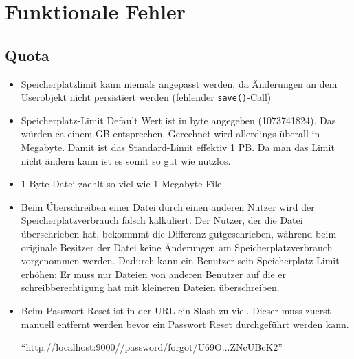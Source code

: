 \documentclass[12pt,DIV14,BCOR10mm,a4paper,parskip=half-,headsepline,headinclude,english,ngerman,bibliography=totocnumbered]{scrreprt}
\begin{document}
\chapter{Funktionale Fehler}


\section{Quota}

\begin{itemize}
 \item Speicherplatzlimit kann niemals angepasst werden, da Änderungen an dem Userobjekt nicht persistiert werden (fehlender \texttt{save()}-Call)
  \item Speicherplatz-Limit Default Wert ist in byte angegeben (1073741824). Das würden ca einem GB entsprechen. Gerechnet wird allerdings überall in Megabyte. Damit ist das Standard-Limit effektiv 1 PB. Da man das Limit nicht ändern kann ist es somit so gut wie nutzlos.
  \item 1 Byte-Datei zaehlt so viel wie 1-Megabyte File
  \item Beim Überschreiben einer Datei durch einen anderen Nutzer wird der Speicherplatzverbrauch falsch kalkuliert. Der Nutzer, der die Datei überschrieben hat, bekommmt die Differenz gutgeschrieben, während beim originale Besitzer der Datei keine Änderungen am Speicherplatzverbrauch vorgenommen werden. Dadurch kann ein Benutzer sein Speicherplatz-Limit erhöhen: Er muss nur Dateien von anderen Benutzer auf die er schreibberechtigung hat mit kleineren Dateien überschreiben.
  \item Beim Passwort Reset ist in der URL ein Slash zu viel. Dieser muss zuerst manuell entfernt werden bevor ein Passwort Reset durchgeführt werden kann.
  
  \enquote{http://localhost:9000//password/forgot/U69O...ZNcUBcK2}
  \end{itemize}
\end{document}
